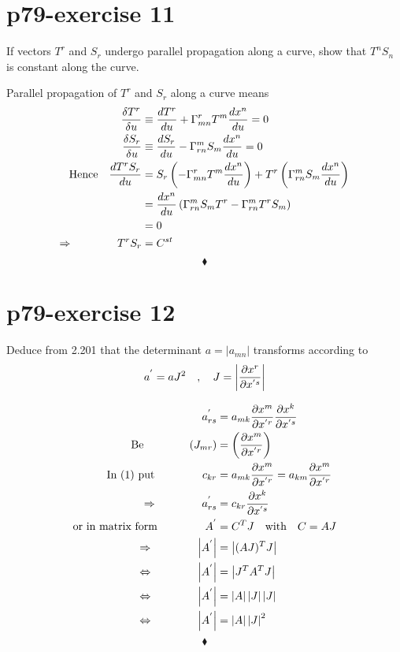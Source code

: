\section{p79-exercise 11}
\begin{tcolorbox}
If vectors $T^r$ and $S_r$ undergo parallel propagation along a curve, show that $T^nS_n$ is constant along the curve.
\end{tcolorbox}
Parallel propagation of $T^r$ and $S_r$  along a curve means
\begin{align}
\frac{\delta T^r}{\delta u} &\equiv \dv{T^r}{u} + \Gamma^r_{mn}T^m \dv{x^n}{u} = 0\\
\frac{\delta S_r}{\delta u} &\equiv \dv{S_r}{u} - \Gamma^m_{rn}S_m \dv{x^n}{u} = 0\\
\text{Hence}\quad \dv{T^rS_r}{u} &= S_r\left(-\Gamma^r_{mn}T^m\dv{x^n}{u}\right) + T^r\left(\Gamma^m_{rn}S_m \dv{x^n}{u} \right)\\
\ &= \dv{x^n}{u}\left(\Gamma^m_{rn}S_mT^r -  \Gamma^m_{rn}T^rS_m\right)\\
\ &=0\\
\Rightarrow \quad\quad\quad\quad T^rS_r &= C^{st}
\end{align} 
$$\blacklozenge$$
\newpage

\section{p79-exercise 12}
\begin{tcolorbox}
Deduce from 2.201 that the determinant $a= \left | a_{mn} \right |$ transforms according to $$a^{'} = aJ^2 \quad , \quad J = \left | \pdv{x^r}{x^{'s}}\right|$$
\end{tcolorbox}
\begin{align}
\ a^{'}_{rs} &= a_{mk} \pdv{x^{m}}{x^{'r}} \pdv{x^{k}}{x^{'s}}\\
\text{Be}\quad\quad\quad\quad \left(J_{mr} \right )&= \left (\pdv{x^{m}}{x^{'r}}\right )\\
\text{In (1) put  }\quad\quad\quad\quad c_{kr} &= a_{mk} \pdv{x^{m}}{x^{'r}}= a_{km} \pdv{x^{m}}{x^{'r}} \\
\Rightarrow\quad\quad\quad\quad a^{'}_{rs} &= c_{kr} \pdv{x^{k}}{x^{'s}}\\
\text{or in matrix form  } \quad\quad\quad\quad A^{'} &= C^T J\quad \text{with}\quad C = AJ\\
\Rightarrow\quad\quad\quad\quad \left |A^{'} \right| &= \left | (AJ)^T J\right |\\
\Leftrightarrow\quad\quad\quad\quad \left |A^{'} \right| &= \left | J^T A^T J\right |\\
\Leftrightarrow\quad\quad\quad\quad \left |A^{'} \right| &= \left | A\right | \left |J\right |\left |J\right |\\
\Leftrightarrow\quad\quad\quad\quad \left |A^{'} \right| &= \left | A\right | \left |J\right | ^2
\end{align}
$$\blacklozenge$$
\newpage

